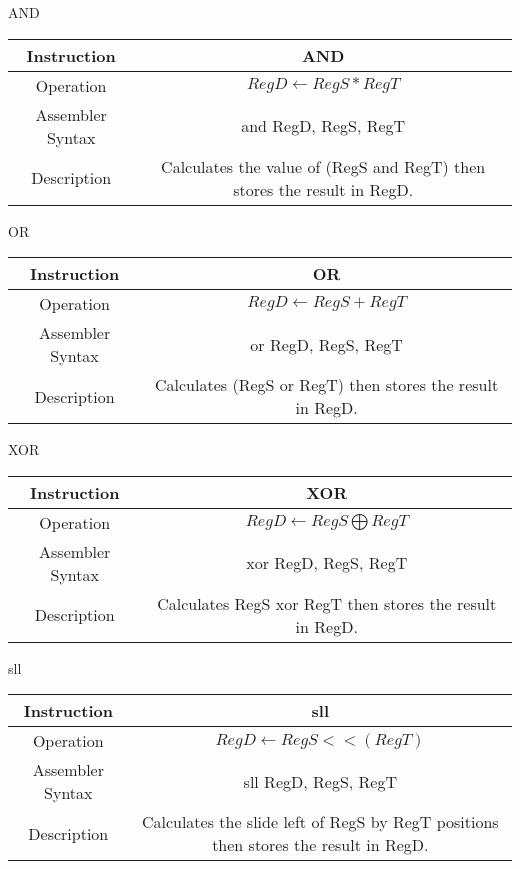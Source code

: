 \documentclass[]{article}
\begin{document}
AND\\
\begin{tabularx}{\textwidth}{c|c}\hline
	Instruction & AND\\\hline
	Operation & $RegD \leftarrow RegS*RegT$\\\hline
	Assembler Syntax & and RegD, RegS, RegT\\\hline
	Description & Calculates the value of (RegS and RegT) then stores the result in RegD.\\\hline
\end{tabularx}\vspace{1.5cm}

OR\\
\begin{tabularx}{\textwidth}{c|c}\hline
	Instruction & OR\\\hline
	Operation & $RegD \leftarrow RegS + RegT$\\\hline
	Assembler Syntax & or RegD, RegS, RegT\\\hline
	Description & Calculates (RegS or RegT) then stores the result in RegD.\\\hline
\end{tabularx}\vspace{1.5cm}

XOR\\
\begin{tabularx}{\textwidth}{c|c}\hline
	Instruction & XOR\\\hline
	Operation & $RegD \leftarrow RegS \bigoplus RegT$\\\hline
	Assembler Syntax & xor RegD, RegS, RegT\\\hline
	Description & Calculates RegS xor RegT then stores the result in RegD.\\\hline
\end{tabularx}\vspace{1.5cm}

sll\\
\begin{tabularx}{\textwidth}{c|c}\hline
	Instruction & sll\\\hline
	Operation & $RegD \leftarrow RegS <<(RegT)$\\\hline
	Assembler Syntax & sll RegD, RegS, RegT\\\hline
	Description & Calculates the slide left of RegS by RegT positions then stores the result in RegD.\\\hline
\end{tabularx}\vspace{1.5cm}
\end{document}

